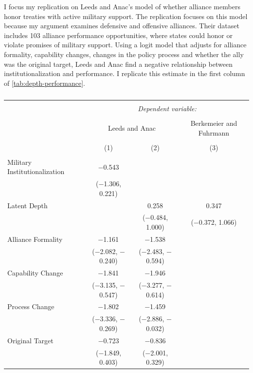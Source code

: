 \documentclass[12pt]{article}
\begin{document}
I focus my replication on Leeds and Anac's model of whether alliance members honor treaties with active military support. 
The replication focuses on this model because my argument examines defensive and offensive alliances. 
Their dataset includes 103 alliance performance opportunities, where states could honor or violate promises of military support. 
Using a logit model that adjusts for alliance formality, capability changes, changes in the policy process and whether the ally was the original target, Leeds and Anac find a negative relationship between institutionalization and performance. 
I replicate this estimate in the first column of \autoref{tab:depth-performance}. 


\begin{table}[!htbp] \centering 
  \caption{} 
  \label{tab:depth-performance} 
\begin{adjustbox}{width= .95\textwidth, center}
\begin{tabular}{@{\extracolsep{5pt}}lccc} 
\\[-1.8ex]\hline 
\hline \\[-1.8ex] 
 & \multicolumn{3}{c}{\textit{Dependent variable:}} \\ 
\cline{2-4} 
\\[-1.8ex] & \multicolumn{2}{c}{Leeds and Anac} & Berkemeier and Fuhrmann \\ 
\\[-1.8ex] & (1) & (2) & (3)\\ 
\hline \\[-1.8ex] 
 Military Institutionalization & $-$0.543 &  &  \\ 
  & ($-$1.306, 0.221) &  &  \\ 
  Latent Depth &  & 0.258 & 0.347 \\ 
  &  & ($-$0.484, 1.000) & ($-$0.372, 1.066) \\ 
  Alliance Formality & $-$1.161$^{}$ & $-$1.538$^{}$ &  \\ 
  & ($-$2.082, $-$0.240) & ($-$2.483, $-$0.594) &  \\ 
  Capability Change & $-$1.841$^{}$ & $-$1.946$^{}$ &  \\ 
  & ($-$3.135, $-$0.547) & ($-$3.277, $-$0.614) &  \\ 
  Process Change & $-$1.802$^{}$ & $-$1.459$^{}$ &  \\ 
  & ($-$3.336, $-$0.269) & ($-$2.886, $-$0.032) &  \\ 
  Original Target & $-$0.723 & $-$0.836 &  \\ 
  & ($-$1.849, 0.403) & ($-$2.001, 0.329) &  \\ 

\end{tabular}
\end{adjustbox}
\end{table}
\end{document}
